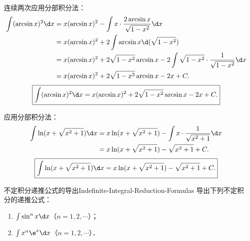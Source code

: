 \begin{solution}

    连续两次应用分部积分法：
    \begin{equation}
        \begin{aligned}
            \int (\arcsin x)^2 \d x & = x(\arcsin x)^2 - \int x \cdot \frac{2\arcsin x}{\sqrt{1 - x^2}} \d x                                 \\
                                    & = x(\arcsin x)^2 + 2\int \arcsin x \d(\sqrt{1 - x^2})                                                  \\
                                    & = x(\arcsin x)^2 + 2\sqrt{1 - x^2}\arcsin x - 2\int \sqrt{1 - x^2} \cdot \frac{1}{\sqrt{1 - x^2}} \d x \\
                                    & = x(\arcsin x)^2 + 2\sqrt{1 - x^2}\arcsin x - 2x + C.
        \end{aligned}
    \end{equation}
    \begin{equation}
        \boxed{\int (\arcsin x)^2 \d x = x(\arcsin x)^2 + 2\sqrt{1 - x^2}\arcsin x - 2x + C.}
    \end{equation}


    应用分部积分法：
    \begin{equation}
        \begin{aligned}
            \int \ln(x + \sqrt{x^2 + 1}) \d x & = x\ln(x + \sqrt{x^2 + 1}) - \int x \cdot \frac{1}{\sqrt{x^2 + 1}} \d x \\
                                              & = x\ln(x + \sqrt{x^2 + 1}) - \sqrt{x^2 + 1} + C.
        \end{aligned}
    \end{equation}
    \begin{equation}
        \boxed{\int \ln(x + \sqrt{x^2 + 1}) \d x = x\ln(x + \sqrt{x^2 + 1}) - \sqrt{x^2 + 1} + C.}
    \end{equation}
\end{solution}

\begin{problem}{不定积分递推公式的导出}{Indefinite-Integral-Reduction-Formulas}
    导出下列不定积分的递推公式：
    \begin{enumerate}
        \item $\int \sin^n x \d x$（$n = 1, 2, \cdots$）；
        \item $\int x^n \e^x \d x$（$n = 1, 2, \cdots$）．
    \end{enumerate}
\end{problem}

